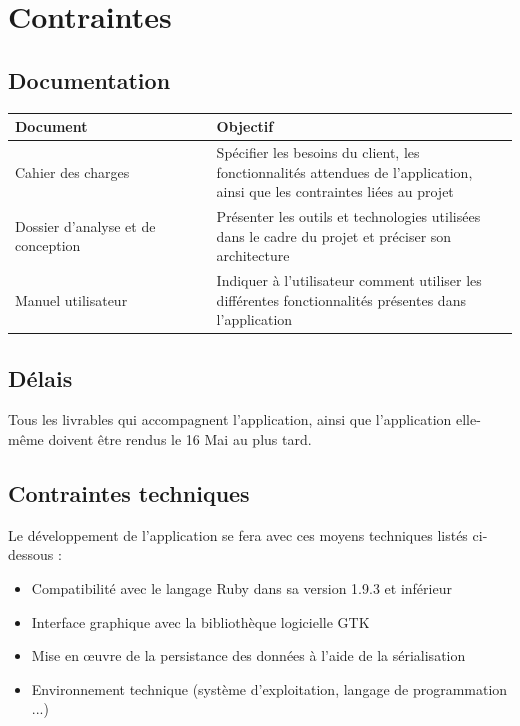 \documentclass[a4paper, 12pt, twoside]{article}
\begin{document}
\section{Contraintes}

\subsection{Documentation}

\begin{tabular}{|>{\centering\arraybackslash}m{0.4\linewidth}|>{\centering\arraybackslash}m{0.6\linewidth}|}
  \hline
  \textbf{Document} & \textbf{Objectif}\\
  \hline
  Cahier des charges & Spécifier les besoins du client, les fonctionnalités attendues de l'application, ainsi que les contraintes liées au projet\\
  \hline
  Dossier d'analyse et de conception & Présenter les outils et technologies utilisées dans le cadre du projet et préciser son architecture\\
  \hline
  Manuel utilisateur & Indiquer à l'utilisateur comment utiliser les différentes fonctionnalités présentes dans l'application\\
  \hline
\end{tabular}


\subsection{Délais}

Tous les livrables qui accompagnent l'application, ainsi que l'application elle-même doivent être rendus le 16 Mai au plus tard.

\subsection{Contraintes techniques}

Le développement de l'application se fera avec ces moyens techniques listés ci-dessous :\newline

\begin{itemize}\setlength{\itemsep}{3mm}

 \item[\textbullet] Compatibilité avec le langage Ruby dans sa version 1.9.3 et inférieur
 \item[\textbullet] Interface graphique avec la bibliothèque logicielle GTK
 \item[\textbullet] Mise en \oe uvre de la persistance des données à l'aide de la sérialisation
 \item[\textbullet] Environnement technique (système d’exploitation, langage de programmation ...)
 
\end{itemize}
\end{document}
